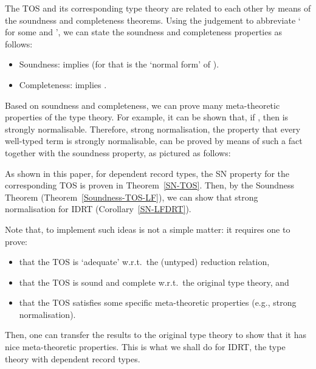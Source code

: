 \documentclass[submission,copyright,creativecommons]{eptcs}
\newcommand{\eg}{{e.g.}}
\newcommand{\wrt}{{w.r.t.}}
\begin{document}
The TOS and its corresponding type theory are related to each other by means of the soundness and completeness theorems.  Using the judgement  to abbreviate ` for some  and ', we can state the soundness and completeness properties as follows:
\begin{itemize}
  \item Soundness:  implies  (for  that is the `normal form' of ).
  \item Completeness:  implies .
\end{itemize}
Based on soundness and completeness, we can prove many meta-theoretic properties of the type theory.  For example, it can be shown that, if , then  is strongly normalisable.  Therefore, strong normalisation, the property that every well-typed term is strongly normalisable, can be proved by means of such a fact together with the soundness property, as pictured as follows:


\noindent As shown in this paper, for dependent record types, the SN property for the corresponding TOS is proven in Theorem~\ref{SN-TOS}.  Then, by the Soundness Theorem (Theorem~\ref{Soundness-TOS-LF}), we can show that strong normalisation for IDRT (Corollary~\ref{SN-LFDRT}).

Note that, to implement such ideas is not a simple matter: it requires one to prove:
\begin{itemize}
  \item that the TOS is `adequate' \wrt\ the (untyped) reduction relation,
  \item that the TOS is sound and complete \wrt\ the original type theory, and
  \item that the TOS satisfies some specific meta-theoretic properties (\eg, strong normalisation).
\end{itemize}
Then, one can transfer the results to the original type theory to show that it has nice meta-theoretic properties.  This is what we shall do for IDRT, the type theory with dependent record types.
\end{document}
